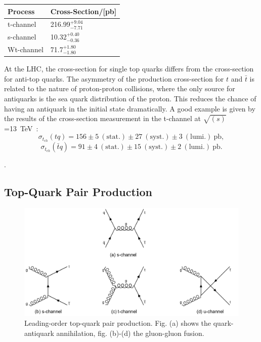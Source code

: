 \begin{center}
	\label{tab:T23}
	
	
	\vspace{0.3cm}	
	
	
\begin{tabular}{>{}m{4.0cm}>{}m{4.0cm}} \toprule
		
		Process& Cross-Section/[pb] \\
		
		\midrule
		t-channel	&216.99$^{+9.04}_{-7.71}$\\
		s-channel	&10.32$^{+0.40}_{-0.36}$\\
		Wt-channel	&71.7$^{+1.80}_{-1.80}$\\
		
		\bottomrule
	\end{tabular}
	
\end{center}


\noindent At the LHC, the cross-section for single top quarks differs from the cross-section for anti-top quarks. The asymmetry of the production cross-section for $t$  and $\bar{t}$ is related to the nature of proton-proton collisions, where the only source for antiquarks is the sea quark distribution of the proton. This reduces the chance of having an antiquark in the initial state dramatically. A good example is given by the results of the cross-section measurement in the t-channel at $\sqrt{(s)}$=13~TeV~\cite{Aaboud:2016ymp}: 
\begin{equation*}
\sigma_ {t_{ch}}(tq)= 156\pm 5~(\text{stat.})\pm 27~(\text{syst.}) \pm 3~(\text{lumi}.)~\text{pb}, 
\end{equation*}
\begin{equation*}
\sigma_ {t_{ch}}(\bar{t}q)= 91\pm 4~(\text{stat.})\pm 15~(\text{syst.}) \pm 2~(\text{lumi}.)~\text{pb}.
\end{equation*}

 

.   


\subsection{Top-Quark Pair Production}
\begin{figure}[h]
	\centering
	\includegraphics[width=0.70\linewidth]{Pics/cp1/ttbar}
	\caption{Leading-order top-quark pair production. Fig. (a) shows the quark- antiquark annihilation, fig. (b)-(d)  the gluon-gluon fusion.} 
	\label{fig:ttbar}
\end{figure}





